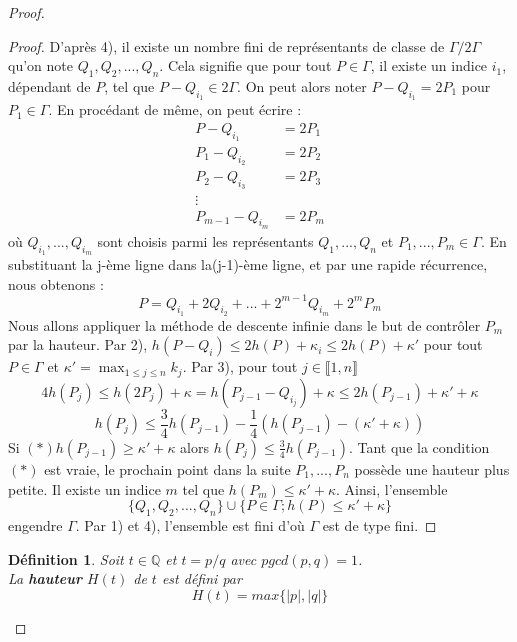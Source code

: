 \documentclass[a4paper]{article}
\newtheorem{definition}{Définition}
\begin{document}
\begin{proof}
\begin{proof}
D'après 4), il existe un nombre fini de représentants de classe de $\Gamma / 2\Gamma$ qu'on note $Q_{1},Q_{2},...,Q_{n}$. Cela signifie que pour tout $P \in \Gamma$, il existe un indice $i_{1}$, dépendant de $P$, tel que $P-Q_{i_{1}} \in 2\Gamma$. On peut alors noter $P-Q_{i_{1}}=2P_{1}$ pour $P_{1} \in \Gamma$. En procédant de même, on peut écrire :
\begin{align*}
P-Q_{i_{1}}&=2P_{1} \\
P_{1}-Q_{i_{2}}&=2P_{2} \\
P_{2}-Q_{i_{3}}&=2P_{3} \\
\vdots \\
P_{m-1}-Q_{i_{m}}&=2P_{m}
\end{align*}
où $Q_{i_{1}},...,Q_{i_{m}}$ sont choisis parmi les représentants $Q_{1},...,Q_{n}$ et $P_{1},...,P_{m} \in \Gamma$.
En substituant la j-ème ligne dans la(j-1)-ème ligne, et par une rapide récurrence, nous obtenons :
\begin{equation}
P=Q_{i_{1}}+2Q_{i_{2}}+...+2^{m-1}Q_{i_{m}}+2^mP_{m}
\end{equation}
Nous allons appliquer la méthode de descente infinie dans le but de contrôler $P_{m}$ par la hauteur.
Par 2), $h(P-Q_{i}) \leqslant 2h(P) + \kappa_{i} \leqslant 2h(P) + \kappa'$ pour tout $P \in \Gamma $ et $\kappa' =\displaystyle \max_{1 \leqslant j \leqslant n} k_{j}$. Par 3), pour tout $j \in  \llbracket 1,n \rrbracket$
\begin{equation*}
4h(P_{j}) \leqslant h(2P_{j})+\kappa=h(P_{j-1}-Q_{i_{j}})+\kappa \leqslant
2h(P_{j-1})+\kappa'+\kappa
\end{equation*}
\begin{equation*}
h(P_{j}) \leqslant \frac{3}{4}h(P_{j-1})-\frac{1}{4}(h(P_{j-1})-(\kappa'+\kappa))
\end{equation*}
Si $(*) h(P_{j-1})\geqslant \kappa'+\kappa$ alors $h(P_{j}) \leqslant \frac{3}{4}h(P_{j-1})$. Tant que la condition $(*)$ est vraie, le prochain point dans la suite $P_{1},...,P_{n}$ possède une hauteur plus petite. Il existe un indice $m$ tel que $h(P_{m}) \leqslant \kappa'+\kappa$.
Ainsi, l'ensemble
\begin{equation*}
\{Q_{1},Q_{2},...,Q_{n}\} \cup \{P \in \Gamma ; h(P) \leqslant \kappa'+\kappa\}
\end{equation*}
engendre $\Gamma$. Par 1) et 4), l'ensemble est fini d'où $\Gamma$ est de type fini.
\end{proof}

\begin{definition}
Soit $t \in \mathbb{Q}$ et $t=p/q$ avec $pgcd(p,q)=1$. \\
La \textbf{hauteur} $H(t)$ de $t$ est défini par 
\begin{equation*}
H(t)=max\{| p |,| q |\}
\end{equation*}
\end{definition}


\end{proof}
\end{document}
